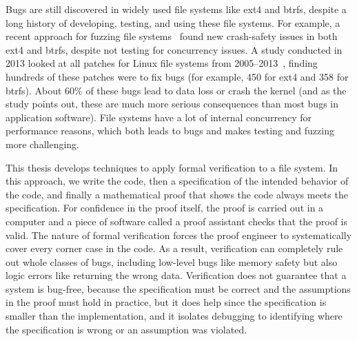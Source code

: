 Bugs are still discovered in widely used file systems like ext4 and btrfs,
despite a long history of developing, testing, and using these file systems. For
example, a
recent approach for fuzzing file systems~\cite{kim:hydra} found new crash-safety
issues in both ext4 and btrfs, despite not testing for concurrency issues. A
study conducted in 2013 looked at all patches for Linux file systems from
2005--2013~\cite{lu:fsstudy}, finding hundreds of these patches were to fix bugs
(for example, 450 for ext4 and 358 for btrfs). About 60\% of these bugs lead to
data loss or crash the kernel (and as the study points out, these are much more
serious consequences than most bugs in application software). File systems have
a lot of internal concurrency for performance reasons, which both leads to bugs
and makes testing and fuzzing more challenging.

This thesis develops techniques to apply formal verification to a file system. In this approach, we write the code, then a specification of the
intended behavior of the code, and finally a mathematical proof that shows the
code always meets the specification. For confidence in the proof itself, the
proof is carried out in a computer and a piece of software called a proof
assistant checks that the proof is valid. The nature of formal verification
forces the proof engineer to systematically cover every corner case in the code.
As a result, verification can completely rule out whole classes of bugs, including
low-level bugs like memory safety but also logic errors like returning the wrong
data. Verification does not guarantee that a system is bug-free, because the
specification must be correct and the assumptions in the proof must hold in
practice, but it does help since the specification is smaller than the
implementation, and it isolates debugging to identifying where the specification
is wrong or an assumption was violated.


